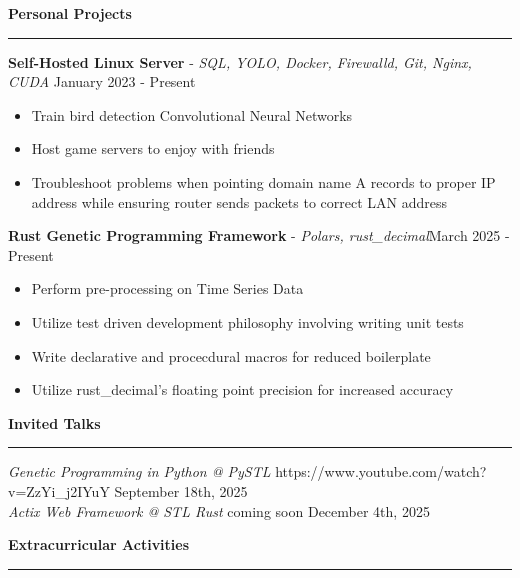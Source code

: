 \documentclass[11pt]{article}
\begin{document}

\vspace{1pt}  %
\textbf{Personal Projects}\par
\vspace{-12pt}
\noindent\rule{\textwidth}{0.4pt}

\textbf{Self-Hosted Linux Server} - \textsl{SQL, YOLO, Docker, Firewalld, Git, Nginx, CUDA} \hfill January 2023 - Present
\begin{itemize}[noitemsep, topsep=0pt, partopsep=0pt, parsep=0pt, itemsep=0pt]
    \small
    \item Train bird detection Convolutional Neural Networks
    \item Host game servers to enjoy with friends
    \item Troubleshoot problems when pointing domain name A records to proper IP address while ensuring router sends packets to correct LAN address
\end{itemize}

\textbf{Rust Genetic Programming Framework} - \textsl{Polars, rust\_decimal}\hfill March 2025 - Present
\begin{itemize}[noitemsep, topsep=0pt, partopsep=0pt, parsep=0pt, itemsep=0pt]
    \small
    \item Perform pre-processing on Time Series Data
    \item Utilize test driven development philosophy involving writing unit tests
    \item Write declarative and procecdural macros for reduced boilerplate
    \item Utilize rust\_decimal's floating point precision for increased accuracy
\end{itemize}

\textbf{Invited Talks}\par
\vspace{-12pt}
\noindent\rule{\textwidth}{0.4pt}

\textsl{Genetic Programming in Python @ PySTL} \tiny{https://www.youtube.com/watch?v=ZzYi\_j2IYuY} \hfill \normalsize{September 18th, 2025}\\
\textsl{Actix Web Framework @ STL Rust} \tiny{coming soon} \hfill \normalsize{December 4th, 2025}

\textbf{Extracurricular Activities}\par
\vspace{-12pt}
\noindent\rule{\textwidth}{0.4pt}
\end{document}
